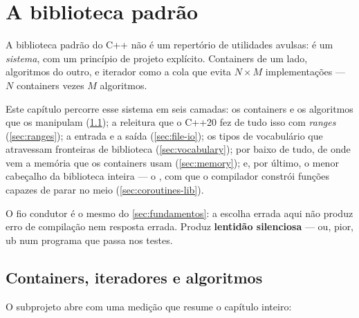 
\section{A biblioteca padrão}
\label{sec:biblioteca}

A biblioteca padrão do C++ não é um repertório de utilidades avulsas: é um
\emph{sistema}, com um princípio de projeto explícito. Containers de um lado,
algoritmos do outro, e \gls{iterador} como a cola que evita $N \times M$
implementações --- $N$ containers vezes $M$ algoritmos.

Este capítulo percorre esse sistema em seis camadas: os containers e os
algoritmos que os manipulam (\cref{sec:stl}); a releitura que o C++20 fez de
tudo isso com \emph{ranges} (\cref{sec:ranges}); a entrada e a saída
(\cref{sec:file-io}); os tipos de vocabulário que atravessam fronteiras de
biblioteca (\cref{sec:vocabulary}); por baixo de tudo, de onde vem a memória
que os containers usam (\cref{sec:memory}); e, por último, o menor cabeçalho da
biblioteca inteira --- o , com que o compilador constrói
funções capazes de parar no meio (\cref{sec:coroutines-lib}).

O fio condutor é o mesmo do \cref{sec:fundamentos}: a escolha errada aqui não
produz erro de compilação nem resposta errada. Produz \textbf{lentidão
silenciosa} --- ou, pior, \gls{ub} num programa que passa nos testes.

\subsection{Containers, iteradores e algoritmos}
\label{sec:stl}

O subprojeto  abre com uma medição que resume o capítulo inteiro:

